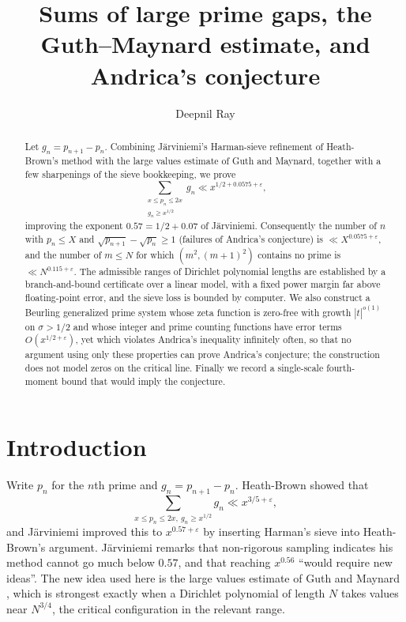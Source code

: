 \documentclass[11pt]{amsart}
\theoremstyle{definition}
\theoremstyle{remark}
\newcommand{\rz}{\RZERO}
\newcommand{\RZERO}{0.0575}
\newcommand{\J}{\cite{J}}
\begin{document}
\title[Large prime gaps and Andrica's conjecture]{Sums of large prime gaps, the Guth--Maynard estimate, and Andrica's conjecture}
\author{Deepnil Ray}
\address{Ashoka University, Sonipat, Haryana, India}
\date{}

\begin{abstract}
Let $g_n=p_{n+1}-p_n$. Combining Järviniemi's Harman-sieve refinement of Heath-Brown's method with the large values estimate of Guth and Maynard, together with a few sharpenings of the sieve bookkeeping, we prove
\[
\sum_{\substack{x\le p_n\le 2x\\ g_n\ge x^{1/2}}} g_n \ll x^{1/2+\rz+\varepsilon},
\]
improving the exponent $0.57=1/2+0.07$ of Järviniemi. Consequently the number of $n$ with $p_n\le X$ and $\sqrt{p_{n+1}}-\sqrt{p_n}\ge 1$ (failures of Andrica's conjecture) is $\ll X^{\rz+\varepsilon}$, and the number of $m\le N$ for which $(m^2,(m+1)^2)$ contains no prime is $\ll N^{0.115+\varepsilon}$. The admissible ranges of Dirichlet polynomial lengths are established by a branch-and-bound certificate over a linear model, with a fixed power margin far above floating-point error, and the sieve loss is bounded by computer. We also construct a Beurling generalized prime system whose zeta function is zero-free with growth $|t|^{o(1)}$ on $\sigma>1/2$ and whose integer and prime counting functions have error terms $O(x^{1/2+\varepsilon})$, yet which violates Andrica's inequality infinitely often, so that no argument using only these properties can prove Andrica's conjecture; the construction does not model zeros on the critical line. Finally we record a single-scale fourth-moment bound that would imply the conjecture.
\end{abstract}

\maketitle

\section{Introduction}

Write $p_n$ for the $n$th prime and $g_n=p_{n+1}-p_n$. Heath-Brown \cite{HB-V} showed that
\[\sum_{x\le p_n\le 2x,\ g_n\ge x^{1/2}} g_n\ll x^{3/5+\varepsilon},\] and Järviniemi \J{} improved this to $x^{0.57+\varepsilon}$ by inserting Harman's sieve into Heath-Brown's argument. Järviniemi remarks \cite[Remark~7.6]{J} that non-rigorous sampling indicates his method cannot go much below $0.57$, and that reaching $x^{0.56}$ ``would require new ideas''. The new idea used here is the large values estimate of Guth and Maynard \cite{GM}, which is strongest exactly when a Dirichlet polynomial of length $N$ takes values near $N^{3/4}$, the critical configuration in the relevant range.
\end{document}
